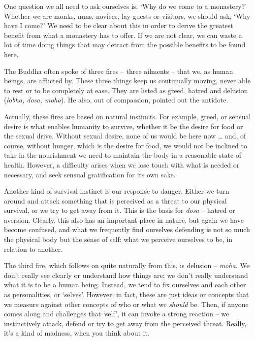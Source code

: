 

One question we all need to ask ourselves is, `Why do we come to a monastery?' Whether we are monks, nuns, novices, lay guests or visitors, we should ask, `Why have I come?' We need to be clear about this in order to derive the greatest benefit from what a monastery has to offer. If we are not clear, we can waste a lot of time doing things that may detract from the possible benefits to be found here.

The Buddha often spoke of three fires -- three ailments -- that we, as human beings, are afflicted by. These three things keep us continually moving, never able to rest or to be completely at ease. They are listed as greed, hatred and delusion (\textit{lobha, dosa, moha}). He also, out of compassion, pointed out the antidote.

Actually, these fires are based on natural instincts. For example, greed, or sensual desire is what enables humanity to survive, whether it be the desire for food or the sexual drive. Without sexual desire, none of us would be here now \ldots{} and, of course, without hunger, which is the desire for food, we would not be inclined to take in the nourishment we need to maintain the body in a reasonable state of health. However, a difficulty arises when we lose touch with what is needed or necessary, and seek sensual gratification for its own sake.

Another kind of survival instinct is our response to danger. Either we turn around and attack something that is perceived as a threat to our physical survival, or we try to get away from it. This is the basis for \textit{dosa} -- hatred or aversion. Clearly, this also has an important place in nature, but again we have become confused, and what we frequently find ourselves defending is not so much the physical body but the sense of self: what we perceive ourselves to be, in relation to another.

The third fire, which follows on quite naturally from this, is delusion -- \textit{moha.} We don't really see clearly or understand how things are; we don't really understand what it is to be a human being. Instead, we tend to fix ourselves and each other as personalities, or `selves'. However, in fact, these are just ideas or concepts that we measure against other concepts of who or what we \textit{should} be. Then, if anyone comes along and challenges that `self', it can invoke a strong reaction -- we instinctively attack, defend or try to get away from the perceived threat. Really, it's a kind of madness, when you think about it.

